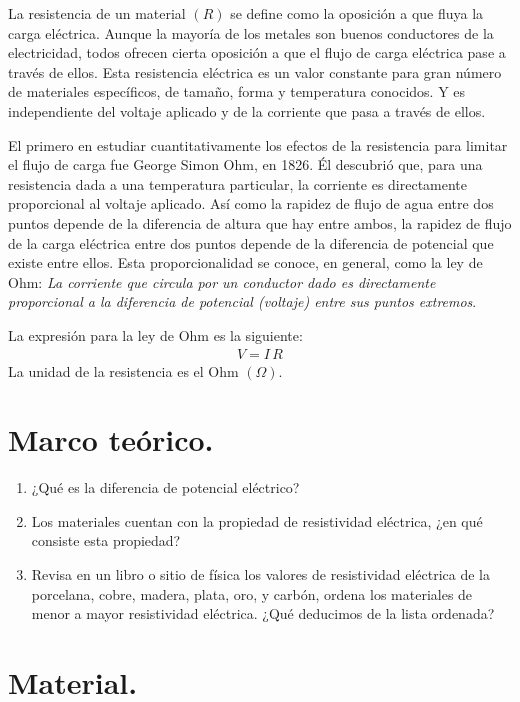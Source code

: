 \documentclass[14pt]{extarticle}
\begin{document}
La resistencia de un material $(R)$ se define como la oposición a que fluya la carga eléctrica. Aunque la mayoría de los metales son buenos conductores de la electricidad, todos ofrecen cierta oposición a que el flujo de carga eléctrica pase a través de ellos. Esta resistencia eléctrica es un valor constante para gran número de materiales específicos, de tamaño, forma y temperatura conocidos. Y es independiente del voltaje aplicado y de la corriente que pasa a través de ellos.
\par
El primero en estudiar cuantitativamente los efectos de la resistencia para limitar el flujo de carga fue George Simon Ohm, en 1826. Él descubrió que, para una resistencia dada a una temperatura particular, la corriente es directamente proporcional al voltaje aplicado. Así como la rapidez de flujo de agua entre dos puntos depende de la diferencia de altura que hay entre ambos, la rapidez de flujo de la carga eléctrica entre dos puntos depende de la diferencia de potencial que existe entre ellos. Esta proporcionalidad se conoce, en general, como la ley de Ohm:
\textit{La corriente que circula por un conductor dado es directamente proporcional a la diferencia de potencial (voltaje) entre sus puntos extremos}.
\par
La expresión para la ley de Ohm es la siguiente:
\begin{align*}
V = I \, R
\end{align*}
La unidad de la resistencia es el Ohm $(\Omega)$.

\section{Marco teórico.}

\begin{enumerate}[label=\alph*)]
\item ¿Qué es la diferencia de potencial eléctrico?
\item Los materiales cuentan con la propiedad de resistividad eléctrica, ¿en qué consiste esta propiedad?
\item Revisa en un libro o sitio de física los valores de resistividad eléctrica de la porcelana, cobre, madera, plata, oro, y carbón, ordena los materiales de menor a mayor resistividad eléctrica. ¿Qué deducimos de la lista ordenada?
\end{enumerate}

\section{Material.}
\end{document}
